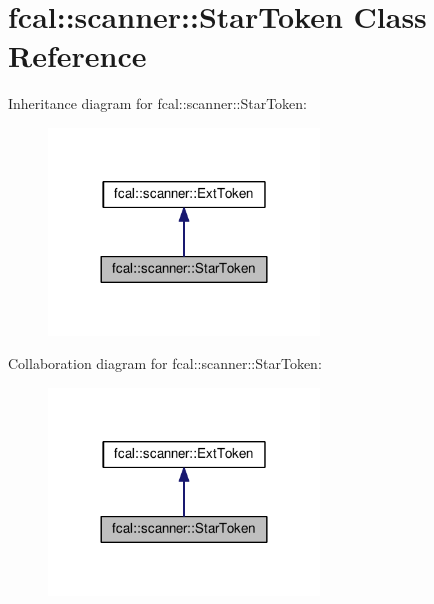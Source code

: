 \hypertarget{classfcal_1_1scanner_1_1StarToken}{}\section{fcal\+:\+:scanner\+:\+:Star\+Token Class Reference}
\label{classfcal_1_1scanner_1_1StarToken}


Inheritance diagram for fcal\+:\+:scanner\+:\+:Star\+Token\+:
\nopagebreak
\begin{figure}[H]
\begin{center}
\leavevmode
\includegraphics[width=204pt]{classfcal_1_1scanner_1_1StarToken__inherit__graph}
\end{center}
\end{figure}


Collaboration diagram for fcal\+:\+:scanner\+:\+:Star\+Token\+:
\nopagebreak
\begin{figure}[H]
\begin{center}
\leavevmode
\includegraphics[width=204pt]{classfcal_1_1scanner_1_1StarToken__coll__graph}
\end{center}
\end{figure}
